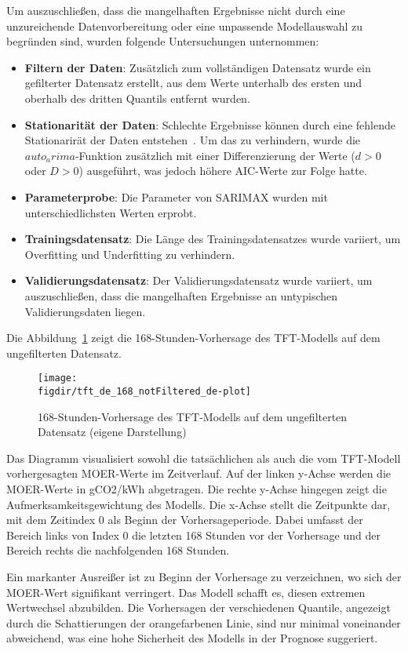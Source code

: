 Um auszuschließen, dass die mangelhaften Ergebnisse nicht durch eine unzureichende Datenvorbereitung oder eine unpassende Modellauswahl zu begründen sind, wurden folgende Untersuchungen unternommen:
\begin{itemize}
 \item \textbf{Filtern der Daten}: Zusätzlich zum vollständigen Datensatz wurde ein gefilterter Datensatz erstellt, aus dem Werte unterhalb des ersten und oberhalb des dritten Quantils entfernt wurden.
 \item \textbf{Stationarität der Daten}: Schlechte Ergebnisse können durch eine fehlende Stationarirät der Daten entstehen~\cite{Artley.26.4.2022}. Um das zu verhindern, wurde die $auto_arima$-Funktion zusätzlich mit einer Differenzierung der Werte ($d > 0$ oder $D > 0$) ausgeführt, was jedoch höhere \ac{AIC}-Werte zur Folge hatte.
 \item \textbf{Parameterprobe}: Die Parameter von \ac{SARIMAX} wurden mit unterschiedlichsten Werten erprobt.
 \item \textbf{Trainingsdatensatz}: Die Länge des Trainingsdatensatzes wurde variiert, um Overfitting und Underfitting zu verhindern.
 \item \textbf{Validierungsdatensatz}: Der Validierungsdatensatz wurde variiert, um auszuschließen, dass die mangelhaften Ergebnisse an untypischen Validierungsdaten liegen.
\end{itemize}

Die Abbildung~\ref{FIG:tft-plot} zeigt die 168-Stunden-Vorhersage des \ac{TFT}-Modells auf dem ungefilterten Datensatz.
\begin{figure}
 \caption[TFT 168-Stunden-Vorhersage auf ungefiltertem Datensatz]{168-Stunden-Vorhersage des \ac{TFT}-Modells auf dem ungefilterten Datensatz (eigene Darstellung)}
 {\texttt{[image: \\figdir/tft\_de\_168\_notFiltered\_de-plot]}}
 \label{FIG:tft-plot}
\end{figure}
Das Diagramm visualisiert sowohl die tatsächlichen als auch die vom \ac{TFT}-Modell vorhergesagten \ac{MOER}-Werte im Zeitverlauf.
Auf der linken y-Achse werden die \ac{MOER}-Werte in g\ac{CO2}/kWh abgetragen.
Die rechte y-Achse hingegen zeigt die Aufmerksamkeitsgewichtung des Modells.
Die x-Achse stellt die Zeitpunkte dar, mit dem Zeitindex 0 als Beginn der Vorhersageperiode.
Dabei umfasst der Bereich links von Index 0 die letzten 168 Stunden vor der Vorhersage und der Bereich rechts die nachfolgenden 168 Stunden.

Ein markanter Ausreißer ist zu Beginn der Vorhersage zu verzeichnen, wo sich der \ac{MOER}-Wert signifikant verringert.
Das Modell schafft es, diesen extremen Wertwechsel abzubilden.
Die Vorhersagen der verschiedenen Quantile, angezeigt durch die Schattierungen der orangefarbenen Linie, sind nur minimal voneinander abweichend, was eine hohe Sicherheit des Modells in der Prognose suggeriert.

